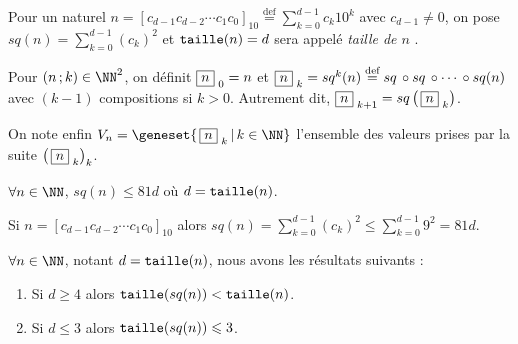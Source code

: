 Pour un naturel 
$\displaystyle      n =  \left[ c_{d-1} c_{d-2} \cdots c_1 c_0 \right]_{10} 
\stackrel{\text{def}}{=} \sum_{k=0}^{d-1} c_k 10^k$
avec $c_{d-1} \neq 0$,
on pose
$\displaystyle sq(n) = \sum_{k=0}^{d-1} (c_k)^2$
et
$\operatorname{\text{\normalfont\texttt{taille}}}(n) = d$ sera appelé \emph{\og taille de $n$ \fg}.

\medskip

Pour $(n \,; k) \in \NN^2$, on définit 
$  \fbox{$n$}_{\,\,0} = n$
et
$  \fbox{$n$}_{\,\,k} = sq^k(n)
\stackrel{\text{def}}{=} sq \,\circ sq \,\circ \cdots \,\circ sq(n)$ avec $(k-1)$ compositions si $k > 0$.
Autrement dit,
$\fbox{$n$}_{\,\,k+1} = sq \left( \, \fbox{$n$}_{\,\,k} \right)$.

\medskip

On note enfin
$V_n = \geneset{ \, \sqseq{n}{k} \, | \, k \in \NN }$
l'ensemble des valeurs prises par la suite $\left( \, \fbox{$n$}_{\,\,k} \right)_k$.



\bigskip

\begin{fact}
	$\forall n \in \NN$, $sq(n) \leqslant 81 d$ où $d = \operatorname{\text{\normalfont\texttt{taille}}}(n)$.
\end{fact}

\begin{proof*}
	Si $n = [c_{d-1} c_{d-2} \cdots c_1 c_0]_{10}$
	alors 
	$\displaystyle sq(n) = \sum_{k=0}^{d-1} (c_k)^2 \leqslant \sum_{k=0}^{d-1} 9^2 = 81 d $.
\end{proof*}




\medskip

\begin{fact}\label{magicmajo}
	$\forall n \in \NN$, notant $d = \operatorname{\text{\normalfont\texttt{taille}}}(n)$, nous avons les résultats suivants :
	
	\begin{enumerate}
		\item Si $d \geqslant 4$ alors $\operatorname{\text{\normalfont\texttt{taille}}}(sq(n)) < \operatorname{\text{\normalfont\texttt{taille}}}(n)$.
		
		\item Si $d \leqslant 3$ alors $\operatorname{\text{\normalfont\texttt{taille}}}(sq(n)) \leqslant 3$.
	\end{enumerate}
\end{fact}

